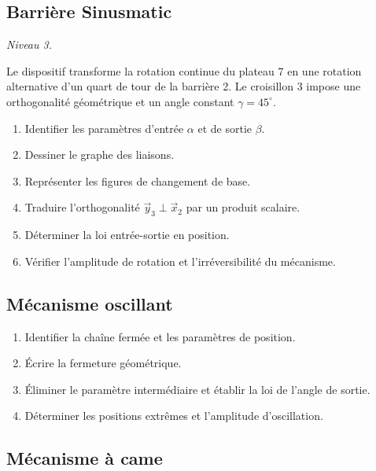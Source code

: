\subsection{Barrière Sinusmatic}

\textit{Niveau 3.}

Le dispositif transforme la rotation continue du plateau 7 en une
rotation alternative d'un quart de tour de la barrière 2. Le croisillon
3 impose une orthogonalité géométrique et un angle constant
$\gamma=45^\circ$.

\begin{center}
\hfill
{}
\end{center}

\begin{enumerate}
  \item Identifier les paramètres d'entrée $\alpha$ et de sortie $\beta$.
  \item Dessiner le graphe des liaisons.
  \item Représenter les figures de changement de base.
  \item Traduire l'orthogonalité $\vec y_3\perp\vec x_2$ par un produit scalaire.
  \item Déterminer la loi entrée-sortie en position.
  \item Vérifier l'amplitude de rotation et l'irréversibilité du mécanisme.
\end{enumerate}

\subsection{Mécanisme oscillant}


\begin{enumerate}
  \item Identifier la chaîne fermée et les paramètres de position.
  \item Écrire la fermeture géométrique.
  \item Éliminer le paramètre intermédiaire et établir la loi de l'angle de sortie.
  \item Déterminer les positions extrêmes et l'amplitude d'oscillation.
\end{enumerate}

\subsection{Mécanisme à came}

